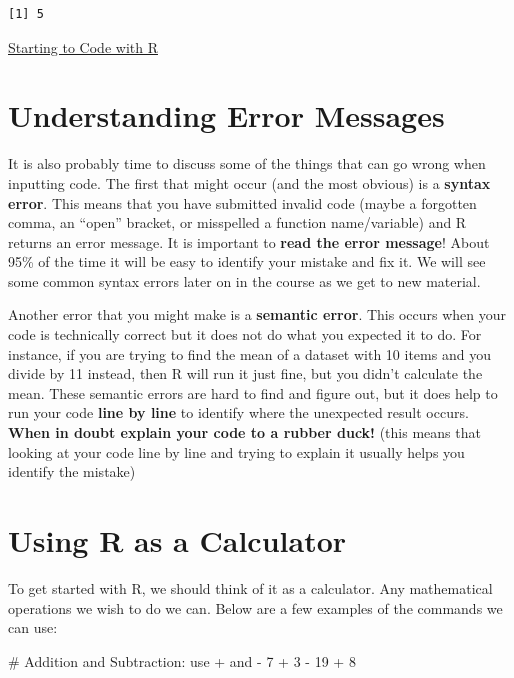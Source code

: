 \documentclass[
  letterpaper,
  DIV=11,
  numbers=noendperiod]{scrreprt}
\newenvironment{Shaded}{\begin{snugshade}}{\end{snugshade}}
\newcommand{\CommentTok}[1]{\textcolor[rgb]{0.37,0.37,0.37}{#1}}
\newcommand{\DecValTok}[1]{\textcolor[rgb]{0.68,0.00,0.00}{#1}}
\newcommand{\SpecialCharTok}[1]{\textcolor[rgb]{0.37,0.37,0.37}{#1}}
\begin{document}
\begin{verbatim}
[1] 5
\end{verbatim}

\begin{watch}{}{}
    \href{https://youtu.be/Wf7Qwbr9Nko}{Starting to Code with R}
\end{watch}

\section{Understanding Error
Messages}\label{understanding-error-messages}

It is also probably time to discuss some of the things that can go wrong
when inputting code. The first that might occur (and the most obvious)
is a \textbf{syntax error}. This means that you have submitted invalid
code (maybe a forgotten comma, an ``open'' bracket, or misspelled a
function name/variable) and R returns an error message. It is important
to \textbf{read the error message}! About 95\% of the time it will be
easy to identify your mistake and fix it. We will see some common syntax
errors later on in the course as we get to new material.

Another error that you might make is a \textbf{semantic error}. This
occurs when your code is technically correct but it does not do what you
expected it to do. For instance, if you are trying to find the mean of a
dataset with 10 items and you divide by 11 instead, then R will run it
just fine, but you didn't calculate the mean. These semantic errors are
hard to find and figure out, but it does help to run your code
\textbf{line by line} to identify where the unexpected result occurs.
\textbf{When in doubt explain your code to a rubber duck!} (this means
that looking at your code line by line and trying to explain it usually
helps you identify the mistake)

\section{Using R as a Calculator}\label{using-r-as-a-calculator}

To get started with R, we should think of it as a calculator. Any
mathematical operations we wish to do we can. Below are a few examples
of the commands we can use:

\begin{Shaded}
\begin{Highlighting}[]
\CommentTok{\# Addition and Subtraction: use + and {-}}
\DecValTok{7} \SpecialCharTok{+} \DecValTok{3} \SpecialCharTok{{-}} \DecValTok{19} \SpecialCharTok{+} \DecValTok{8}
\end{Highlighting}
\end{Shaded}
\end{document}
